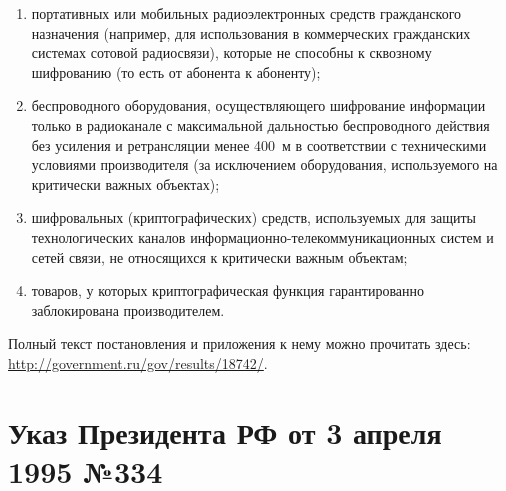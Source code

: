 {\begin{enumerate}
\item портативных или мобильных радиоэлектронных средств гражданского назначения (например, для использования в коммерческих гражданских системах сотовой радиосвязи), которые не способны к сквозному шифрованию (то есть от абонента к абоненту);
\item беспроводного оборудования, осуществляющего шифрование информации только в радиоканале с максимальной дальностью беспроводного действия без усиления и ретрансляции менее 400 м в соответствии с техническими условиями производителя (за исключением оборудования, используемого на критически важных объектах);
\item шифровальных (криптографических) средств, используемых для защиты технологических каналов информационно-телекоммуникационных систем и сетей связи, не относящихся к критически важным объектам;
\item товаров, у которых криптографическая функция гарантированно заблокирована производителем.
\end{enumerate}
Полный текст постановления и приложения к нему можно прочитать здесь: \url{http://government.ru/gov/results/18742/}.
\section{Указ Президента РФ от 3 апреля 1995 №334}
}
